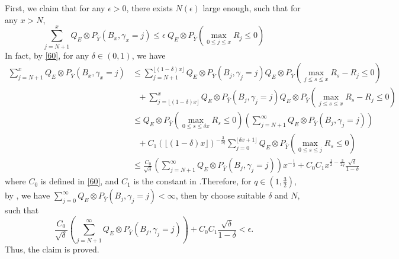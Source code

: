 \documentclass[]{article}
\makeatletter
\numberwithin{equation}{section}
\renewenvironment{proof}[1][\proofname]{%
	\par\pushQED{\qed}\normalfont%
	\topsep6\p@\@plus6\p@\relax
	\trivlist\item[\hskip\labelsep\bfseries#1\@addpunct{.}]%
	\ignorespaces
}{%
	\popQED\endtrivlist\@endpefalse
}
\theoremstyle{thmstyleone}%
\theoremstyle{thmstyletwo}%
\theoremstyle{thmstylethree}%
\theoremstyle{thmstylefour}%
\theoremstyle{thmstylefive}%
\theoremstyle{thmstylesix}%
\newcommand{\abs}[1]{\lfloor #1 \rfloor}
\makeatother
\begin{document}
	\begin{proof}[Proof of \Cref{Theorem of intermediately cases}]
		First, we claim that for any $\epsilon>0$, there exists $N(\epsilon)$ large enough, such that for any $x>N$,
		\begin{equation*}
			\sum_{j=N+1}^{x} Q_E\otimes P_{\overline{Y}}
			\left(
			B_x,\gamma_x = j
			\right)\leqslant \epsilon ~ Q_E\otimes P_{\overline{Y}}
			\left(
			\max_{0\leqslant j\leqslant x} R_j \leqslant 0
			\right)
		\end{equation*}
		In fact, by \cref{60}, for any $\delta\in (0,1)$, we have
		\begin{align*}
			\sum_{j=N+1}^{x} Q_E\otimes P_{\overline{Y}}
			\left(
			B_x,\gamma_x = j
			\right)
			&\leqslant
			\sum_{j=N+1}^{\abs{(1-\delta)x}}
			Q_E\otimes P_{\overline{Y}} \left(
			B_j,\gamma_j = j
			\right) Q_E\otimes P_{\overline{Y}}
			\left(
			\max_{j\leqslant s\leqslant x}R_s-R_j \leqslant 0
			\right)
			\nonumber\\
			&~~~+
			\sum_{j=\abs{(1-\delta)x}}^{x} Q_E\otimes P_{\overline{Y}} \left(
			B_j,\gamma_j = j
			\right) Q_E\otimes P_{\overline{Y}}
			\left(
			\max_{j\leqslant s\leqslant x}R_s-R_j \leqslant 0
			\right)
			\\
			&\leqslant
			Q_E\otimes P_{\overline{Y}}
			\left(
			\max_{0\leqslant s\leqslant \delta x}R_s \leqslant 0
			\right)
			\left(\sum_{j=N+1}^{\infty} Q_E\otimes P_{\overline{Y}} \left(
			B_j,\gamma_j = j
			\right)\right)
			\\
			&~~~+ C_1(\abs{(1-\delta)x})^{-\frac{3}{2q}} \sum_{j=0}^{\abs{\delta x+1}}  Q_E\otimes P_{\overline{Y}}
			\left(
			\max_{0\leqslant s\leqslant j}R_s \leqslant 0
			\right)
			\\
			&\leqslant
			\frac{C_0}{\sqrt{\delta}}
			\left(\sum_{j=N+1}^{\infty} Q_E\otimes P_{\overline{Y}} \left(
			B_j,\gamma_j = j
			\right)\right) x^{-\frac{1}{2}}
			+ C_0C_1 x^{\frac{1}{2}-\frac{3}{2q}} \frac{\sqrt{\delta}}{1-\delta}
		\end{align*}
		where $C_0$ is defined in \cref{60}, and $C_1$ is the constant in  .Therefore, for $q\in (1,\frac{3}{2})$, by , we have $\sum\limits_{j=0}^{\infty} Q_E\otimes P_{\overline{Y}} \left(
		B_j,\gamma_j = j
		\right)<\infty$, then by choose suitable $\delta$ and $N$, such that
		\begin{equation*}
			\frac{C_0}{\sqrt{\delta}}\left(\sum_{j=N+1}^{\infty} Q_E\otimes P_{\overline{Y}} \left(
			B_j,\gamma_j = j
			\right)\right) +C_0C_1 \frac{\sqrt{\delta}}{1-\delta}<\epsilon.
		\end{equation*}
		Thus, the claim is proved.
		

\end{proof}
\end{document}
